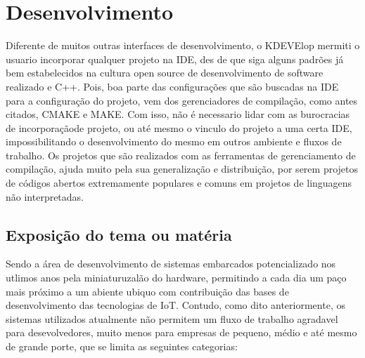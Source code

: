 \chapter{Desenvolvimento}

Diferente de muitos outras interfaces de desenvolvimento, o KDEVElop mermiti o usuario incorporar qualquer projeto na IDE,
des de que siga alguns padrões já bem estabelecidos na cultura open source de desenvolvimento de software realizado e C++.
Pois, boa parte das configurações que são buscadas na IDE para a configuração do projeto, vem dos gerenciadores de compilação,
como antes citados, CMAKE e MAKE. Com isso, não é necessario lidar com as burocracias de incorporaçãode projeto, ou até mesmo
o vinculo do projeto a uma certa IDE, impossibilitando o desenvolvimento do mesmo em outros ambiente e fluxos de trabalho.
Os projetos que são realizados com as ferramentas de gerenciamento de compilação, ajuda muito pela sua generalização e
distribuição, por serem projetos de códigos abertos extremamente populares e comuns em projetos de linguagens não interpretadas.

\section{Exposição do tema ou matéria}

Sendo a área de desenvolvimento de sistemas embarcados potencializado nos utlimos anos pela miniaturuzalão do hardware, permitindo
a cada dia um paço mais próximo a um abiente ubiquo com contribuição das bases de desenvolvimento das tecnologias de IoT. Contudo,
como dito anteriormente, os sistemas utilizados atualmente não permitem um fluxo de trabalho agradavel para desevolvedores, muito menos
para empresas de pequeno, médio e até mesmo de grande porte, que se limita as seguintes categorias:

